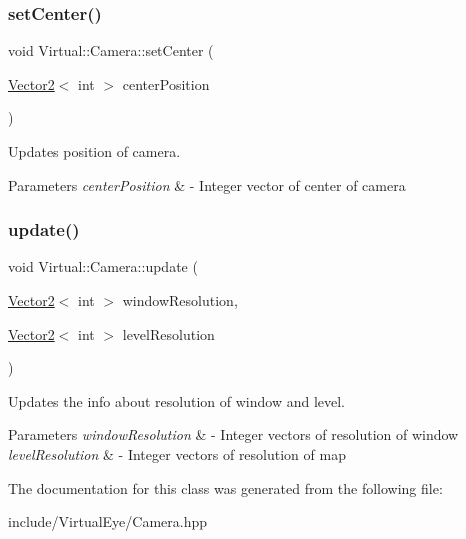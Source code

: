 \subsubsection{\texorpdfstring{set\+Center()}{setCenter()}}
{\footnotesize\ttfamily void Virtual\+::\+Camera\+::set\+Center (\begin{DoxyParamCaption}\item[{\hyperlink{struct_virtual_1_1_vector2}{Vector2}$<$ int $>$}]{center\+Position }\end{DoxyParamCaption})}



Updates position of camera. 


\begin{DoxyParams}{Parameters}
{\em center\+Position} & -\/ Integer vector of center of camera \\
\hline
\end{DoxyParams}
\hypertarget{class_virtual_1_1_camera_a6916239ab1b8ad4a9b1c20c36f28de18}{}\label{class_virtual_1_1_camera_a6916239ab1b8ad4a9b1c20c36f28de18} 
\subsubsection{\texorpdfstring{update()}{update()}}
{\footnotesize\ttfamily void Virtual\+::\+Camera\+::update (\begin{DoxyParamCaption}\item[{\hyperlink{struct_virtual_1_1_vector2}{Vector2}$<$ int $>$}]{window\+Resolution,  }\item[{\hyperlink{struct_virtual_1_1_vector2}{Vector2}$<$ int $>$}]{level\+Resolution }\end{DoxyParamCaption})}



Updates the info about resolution of window and level. 


\begin{DoxyParams}{Parameters}
{\em window\+Resolution} & -\/ Integer vectors of resolution of window \\
\hline
{\em level\+Resolution} & -\/ Integer vectors of resolution of map \\
\hline
\end{DoxyParams}


The documentation for this class was generated from the following file\+:\begin{DoxyCompactItemize}
\item 
include/\+Virtual\+Eye/Camera.\+hpp\end{DoxyCompactItemize}

